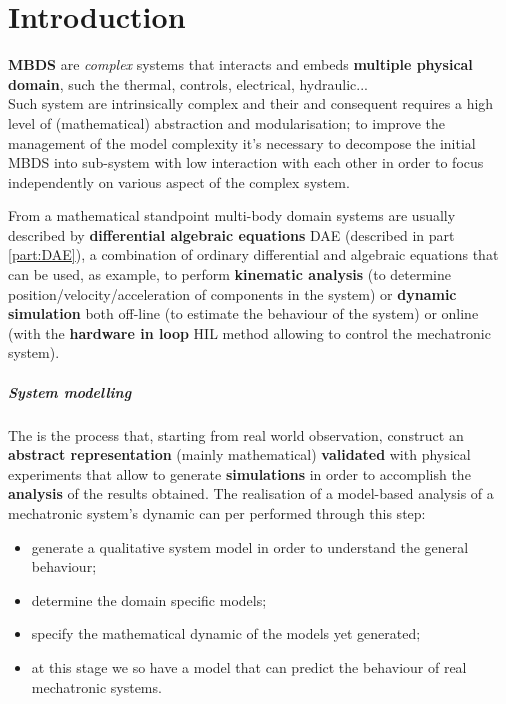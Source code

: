 \chapter{Introduction}
	 \textbf{MBDS} are \textit{complex} systems that interacts and embeds \textbf{multiple physical domain}, such the thermal, controls, electrical, hydraulic...\\
	Such system are intrinsically complex and their  and consequent  requires a high level of (mathematical) abstraction and modularisation; to improve the management of the model complexity it's necessary to decompose the initial MBDS into sub-system with low interaction with each other in order to focus independently on various aspect of the complex system.
	
	From a mathematical standpoint multi-body domain systems are usually described by \textbf{differential algebraic equations} DAE (described in part \ref{part:DAE}), a combination of ordinary differential and algebraic equations that can be used, as example, to perform \textbf{kinematic analysis} (to determine position/velocity/acceleration of components in the system) or \textbf{dynamic simulation} both off-line (to estimate the behaviour of the system) or online (with the \textbf{hardware in loop} HIL method allowing to control the mechatronic system).
	
	\paragraph{System modelling} The  is the process that, starting from real world observation, construct an \textbf{abstract representation} (mainly mathematical)  \textbf{validated} with physical experiments that allow to generate \textbf{simulations} in order to accomplish the \textbf{analysis} of the results obtained. The realisation of a model-based analysis of a mechatronic system's dynamic can per performed through this step:
	\begin{itemize}
		\item generate a qualitative system model in order to understand the general behaviour;
		\item determine the domain specific models;
		\item specify the mathematical dynamic of the models yet generated;
		\item at this stage we so have a model that can predict the behaviour of real mechatronic systems.
	\end{itemize}
	

